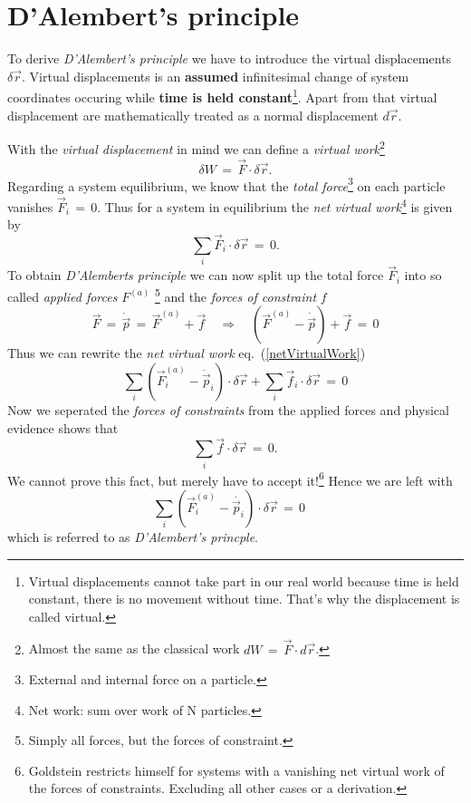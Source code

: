 \section{D'Alembert's principle}
To derive \textit{D'Alembert's principle} we have to introduce the virtual
displacements $\delta \vec r$. Virtual displacements is an \textbf{assumed}
infinitesimal change of system coordinates occuring while \textbf{time is held
constant}\footnote{Virtual displacements cannot take part in our real world
because time is held constant, there is no movement without time. That's why
the displacement is called virtual.}. Apart from that virtual displacement are
mathematically treated as a normal displacement $d \vec r$. 

With the \textit{virtual displacement} in mind we can define a \textit{virtual
work}\footnote{Almost the same as the classical work $dW \,=\, \vec F \cdot d \vec r$.}
\begin{equation}
  \delta W \,=\, \vec F \cdot \delta \vec r.
\end{equation}
Regarding a system equilibrium, we know that the \textit{total
force}\footnote{External and internal force on a particle.} on each particle
vanishes $\vec F_i \,=\, 0$. Thus for a system in equilibrium the
\textit{net virtual work}\footnote{Net work: sum over work of N particles.} is given by
\begin{equation}
  \label{netVirtualWork}
  \sum_{i} \vec F_i \cdot \delta \vec r \,=\, 0.
\end{equation}
To obtain \textit{D'Alemberts principle} we can now split up the total force
$\vec F_i$ into so called \textit{applied forces} $F^{(a)}$ \footnote{Simply all forces, but the
forces of constraint.} and the \textit{forces of constraint} $f$
\begin{equation}
  \vec F \,=\, \dot{\vec p} \,=\, \vec F^{(a)} + \vec f \quad \Rightarrow \quad
(\vec F^{(a)} - \dot{\vec p}) + \vec f \,=\, 0 
\end{equation}
Thus we can rewrite the \textit{net virtual work} eq.~(\ref{netVirtualWork})
\begin{equation}
  \sum_{i} (\vec F_i^{(a)} - \dot{\vec p}_i) \cdot \delta \vec r + \sum_{i} \vec f_i \cdot \delta \vec r
\,=\, 0
\end{equation}
Now we seperated the \textit{forces of constraints} from the applied forces and
physical evidence shows that
\begin{equation}
  \sum_{i} \vec f \cdot \delta \vec r \,=\, 0.
\end{equation}
We cannot prove this fact, but merely have to accept it!\footnote{Goldstein
restricts himself for systems with a vanishing net virtual work of the forces
of constraints. Excluding all other cases or a derivation.} Hence we are left
with
\begin{equation}
  \label{dAlembertPrinciple}
  \sum_{i} (\vec F_i^{(a)} - \dot{\vec p_i}) \cdot \delta \vec r \,=\, 0 \quad
\end{equation}
which is referred to as \textit{D'Alembert's princple}.

